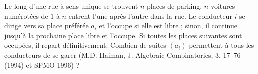 Le long d'une rue à sens unique se trouvent $n$ places de parking. $n$ voitures numérotées de $1$ à $n$ entrent l'une après l'autre dans la rue. Le conducteur $i$ se dirige vers sa place préférée $a_i$ et l'occupe si elle est libre ; sinon, il continue jusqu'à la prochaine place libre et l'occupe. Si toutes les places suivantes sont occupées, il repart définitivement. Combien de suites $(a_i)$ permettent à tous les conducteurs de se garer (M.D. Haiman, J. Algebraic Combinatorics, 3, 17--76 (1994) et SPMO 1996) ?
